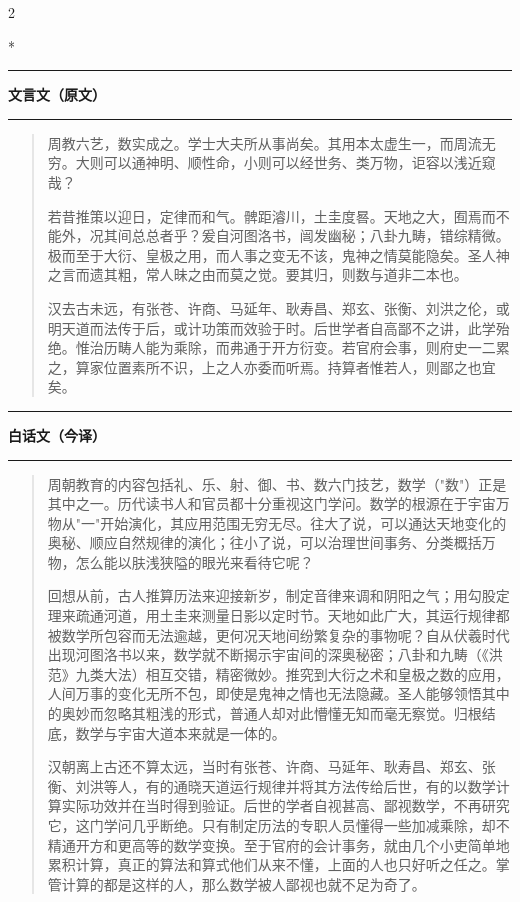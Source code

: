 \documentclass[11pt,a4paper]{article}
\newenvironment{preface}{%
  \begin{quote}\color{prefacecolor}%
}{\end{quote}}
\newcommand{\leftcolheader}{%
  \noindent\textcolor{leftheader}{\rule{\columnwidth}{1.5pt}}\par
  \vspace{2pt}
  \noindent\textbf{\color{leftheader}\chinese 文言文（原文）}\par
  \vspace{2pt}
  \noindent\textcolor{leftheader}{\rule{\columnwidth}{0.6pt}}\par
  \vspace{4pt}
}
\newcommand{\rightcolheader}{%
  \noindent\textcolor{rightheader}{\rule{\columnwidth}{1.5pt}}\par
  \vspace{2pt}
  \noindent\textbf{\color{rightheader}\chinese 白话文（今译）}\par
  \vspace{2pt}
  \noindent\textcolor{rightheader}{\rule{\columnwidth}{0.6pt}}\par
  \vspace{4pt}
}
\begin{document}
\begin{paracol}{2}

\switchcolumn[0]*\leftcolheader

\begin{preface}
周教六艺，数实成之。学士大夫所从事尚矣。其用本太虚生一，而周流无穷。大则可以通神明、顺性命，小则可以经世务、类万物，讵容以浅近窥哉？

若昔推策以迎日，定律而和气。髀距濬川，土圭度晷。天地之大，囿焉而不能外，况其间总总者乎？爰自河图洛书，闿发幽秘；八卦九畴，错综精微。极而至于大衍、皇极之用，而人事之变无不该，鬼神之情莫能隐矣。圣人神之言而遗其粗，常人昧之由而莫之觉。要其归，则数与道非二本也。

汉去古未远，有张苍、许商、马延年、耿寿昌、郑玄、张衡、刘洪之伦，或明天道而法传于后，或计功策而效验于时。后世学者自高鄙不之讲，此学殆绝。惟治历畴人能为乘除，而弗通于开方衍变。若官府会事，则府史一二累之，算家位置素所不识，上之人亦委而听焉。持算者惟若人，则鄙之也宜矣。
\end{preface}

\switchcolumn\rightcolheader

\begin{quote}\small\color{prefacecolor}
周朝教育的内容包括礼、乐、射、御、书、数六门技艺，数学（"数"）正是其中之一。历代读书人和官员都十分重视这门学问。数学的根源在于宇宙万物从"一"开始演化，其应用范围无穷无尽。往大了说，可以通达天地变化的奥秘、顺应自然规律的演化；往小了说，可以治理世间事务、分类概括万物，怎么能以肤浅狭隘的眼光来看待它呢？

回想从前，古人推算历法来迎接新岁，制定音律来调和阴阳之气；用勾股定理来疏通河道，用土圭来测量日影以定时节。天地如此广大，其运行规律都被数学所包容而无法逾越，更何况天地间纷繁复杂的事物呢？自从伏羲时代出现河图洛书以来，数学就不断揭示宇宙间的深奥秘密；八卦和九畴（《洪范》九类大法）相互交错，精密微妙。推究到大衍之术和皇极之数的应用，人间万事的变化无所不包，即使是鬼神之情也无法隐藏。圣人能够领悟其中的奥妙而忽略其粗浅的形式，普通人却对此懵懂无知而毫无察觉。归根结底，数学与宇宙大道本来就是一体的。

汉朝离上古还不算太远，当时有张苍、许商、马延年、耿寿昌、郑玄、张衡、刘洪等人，有的通晓天道运行规律并将其方法传给后世，有的以数学计算实际功效并在当时得到验证。后世的学者自视甚高、鄙视数学，不再研究它，这门学问几乎断绝。只有制定历法的专职人员懂得一些加减乘除，却不精通开方和更高等的数学变换。至于官府的会计事务，就由几个小吏简单地累积计算，真正的算法和算式他们从来不懂，上面的人也只好听之任之。掌管计算的都是这样的人，那么数学被人鄙视也就不足为奇了。
\end{quote}

\end{paracol}
\end{document}

